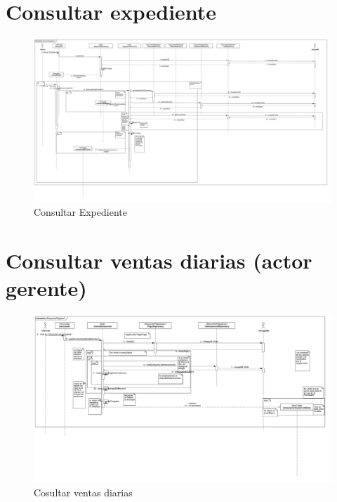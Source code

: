 \section{Consultar expediente}
\begin{figure}[htbp!]
		\centering
			\includegraphics[width=1\textwidth]{uml/DiagramasSecuencia/RubenMurga/getExpediente}
		\caption{Consultar Expediente}
	\end{figure}
\newpage
\section{Consultar ventas diarias (actor gerente)}
\begin{figure}[htbp!]
		\centering
			\includegraphics[width=1\textwidth]{uml/DiagramasSecuencia/RubenMurga/getVentasDia}
		\caption{Cosultar ventas diarias}
	\end{figure}
\newpage
